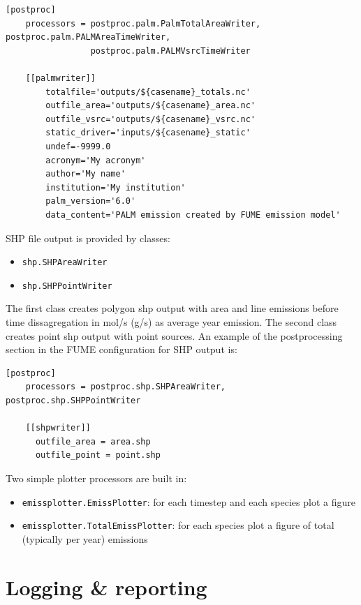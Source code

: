 \documentclass[a4paper,11pt]{article}
\begin{document}
\begin{verbatim}
[postproc]
    processors = postproc.palm.PalmTotalAreaWriter, postproc.palm.PALMAreaTimeWriter,
                 postproc.palm.PALMVsrcTimeWriter
    
    [[palmwriter]]
        totalfile='outputs/${casename}_totals.nc'
        outfile_area='outputs/${casename}_area.nc'
        outfile_vsrc='outputs/${casename}_vsrc.nc'
        static_driver='inputs/${casename}_static'
        undef=-9999.0
        acronym='My acronym'
        author='My name'
        institution='My institution'
        palm_version='6.0'
        data_content='PALM emission created by FUME emission model'
\end{verbatim}

SHP file output is provided by classes: 
\begin{itemize}
\item
  \verb|shp.SHPAreaWriter|
\item
  \verb|shp.SHPPointWriter|
\end{itemize}
The first class creates polygon shp output with area and line emissions before time dissagregation in mol/s (g/s) as average year emission. The second class creates point shp output with point sources.  An example of the postprocessing section in the FUME configuration for SHP output is:

\begin{verbatim}
[postproc]
    processors = postproc.shp.SHPAreaWriter, postproc.shp.SHPPointWriter
    
    [[shpwriter]]
      outfile_area = area.shp
      outfile_point = point.shp
\end{verbatim}



Two simple plotter processors are built in:

\begin{itemize}
\item
  \verb|emissplotter.EmissPlotter|: for each timestep and each species plot a
  figure
\item
  \verb|emissplotter.TotalEmissPlotter|: for each species plot a figure of
  total (typically per year) emissions
\end{itemize}

\section{Logging \& reporting}
\end{document}
